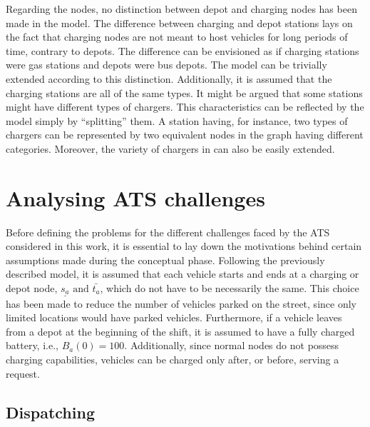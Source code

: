 Regarding the nodes, no distinction between depot and charging nodes has been made in the model. The difference between charging and depot stations lays on the fact that charging nodes are not meant to host vehicles for long periods of time, contrary to depots. The difference can be envisioned as if charging stations were gas stations and depots were bus depots. The model can be trivially extended according to this distinction. Additionally, it is assumed that the charging stations are all of the same types. It might be argued that some stations might have different types of chargers. This characteristics can be reflected by the model simply by ``splitting'' them. A station having, for instance, two types of chargers can be represented by two equivalent nodes in the graph having different categories. Moreover, the variety of chargers in  can also be easily extended. 


\section{Analysing ATS challenges}\label{sec:ats_challenges_analysis}
Before defining the problems for the different challenges faced by the ATS considered in this work, it is essential to lay down the motivations behind certain assumptions made during the conceptual phase. Following the previously described model, it is assumed that each vehicle starts and ends at a charging or depot node, $\underline{s_a} \text{ and }\bar{t_a}$, which do not have to be necessarily the same. This choice has been made to reduce the number of vehicles parked on the street, since only limited locations would have parked vehicles. Furthermore, if a vehicle leaves from a depot at the beginning of the shift, it is assumed to have a fully charged battery, i.e., $B_a(0) = 100$. Additionally, since normal nodes do not possess charging capabilities, vehicles can be charged only after, or before, serving a request.



\subsection{Dispatching}

